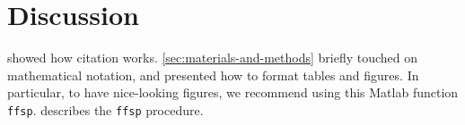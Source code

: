 

\section{Discussion \label{sec:discussion}}
	 showed how citation works.
	\ref{sec:materials-and-methods} briefly touched on mathematical notation, and  presented how to format tables and figures.
	In particular, to have nice-looking figures, we recommend using this Matlab function \texttt{ffsp}.
	 describes the \texttt{ffsp} procedure.
	
